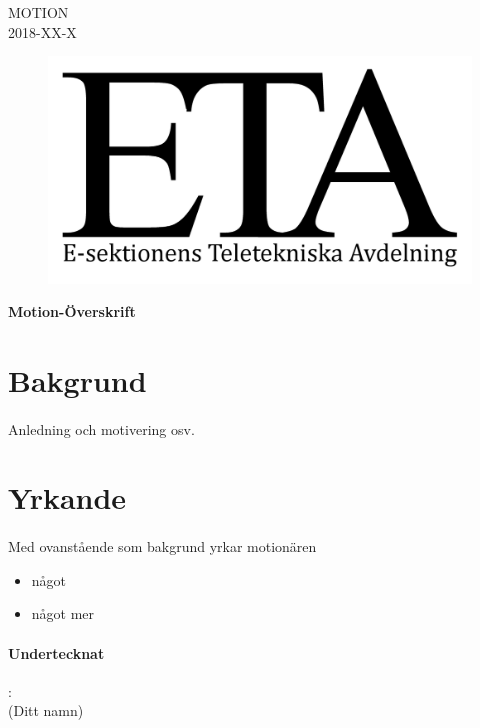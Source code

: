 \documentclass[a4paper, 12pt]{article}
\begin{document}
\titlespacing{\subsection}{0pt}{\parskip}{-\parskip}
\titlespacing{\subsubsection}{0pt}{\parskip}{-\parskip}

\flushright
MOTION\\
2018-XX-X

\flushleft

\begin{figure}[h]
    \includegraphics[scale = 2.4]{ETA-logga.png}
\end{figure}
{\LARGE \textbf{Motion-Överskrift}}
\newline
\hrulefill

\section*{Bakgrund}
\paragraph{}
Anledning och motivering osv.


\section*{Yrkande}
\paragraph{}
Med ovanstående som bakgrund yrkar motionären

\begin{itemize}
  \setlength\itemsep{0.2em}
  \item något
  \item något mer
\end{itemize}


\paragraph{Undertecknat}
:
\\(Ditt namn)
\end{document}
